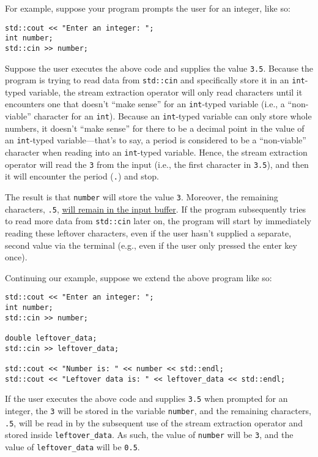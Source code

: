 \documentclass{article}
\begin{document}
For example, suppose your program prompts the user for an integer, like so:

\begin{verbatim}
std::cout << "Enter an integer: ";
int number;
std::cin >> number;
\end{verbatim}

Suppose the user executes the above code and supplies the value \texttt{3.5}. Because the program is trying to read data from \texttt{std::cin} and specifically store it in an \texttt{int}-typed variable, the stream extraction operator will only read characters until it encounters one that doesn't ``make sense'' for an \texttt{int}-typed variable (i.e., a ``non-viable'' character for an \texttt{int}). Because an \texttt{int}-typed variable can only store whole numbers, it doesn't ``make sense'' for there to be a decimal point in the value of an \texttt{int}-typed variable---that's to say, a period is considered to be a ``non-viable'' character when reading into an \texttt{int}-typed variable. Hence, the stream extraction operator will read the \texttt{3} from the input (i.e., the first character in \texttt{3.5}), and then it will encounter the period (\texttt{.}) and stop.

The result is that \texttt{number} will store the value \texttt{3}. Moreover, the remaining characters, \texttt{.5}, \ul{will remain in the input buffer}. If the program subsequently tries to read more data from \texttt{std::cin} later on, the program will start by immediately reading these leftover characters, even if the user hasn't supplied a separate, second value via the terminal (e.g., even if the user only pressed the enter key once).

Continuing our example, suppose we extend the above program like so:

\begin{verbatim}
std::cout << "Enter an integer: ";
int number;
std::cin >> number;

double leftover_data;
std::cin >> leftover_data;

std::cout << "Number is: " << number << std::endl;
std::cout << "Leftover data is: " << leftover_data << std::endl;
\end{verbatim}

If the user executes the above code and supplies \texttt{3.5} when prompted for an integer, the \texttt{3} will be stored in the variable \texttt{number}, and the remaining characters, \texttt{.5}, will be read in by the subsequent use of the stream extraction operator and stored inside \texttt{leftover\_data}. As such, the value of \texttt{number} will be \texttt{3}, and the value of \texttt{leftover\_data} will be \texttt{0.5}.
\end{document}
